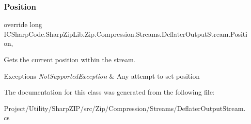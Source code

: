 \subsubsection{\texorpdfstring{Position}{Position}}
{\footnotesize\ttfamily override long I\+C\+Sharp\+Code.\+Sharp\+Zip\+Lib.\+Zip.\+Compression.\+Streams.\+Deflater\+Output\+Stream.\+Position\hspace{0.3cm}{\ttfamily [get]}, {\ttfamily [set]}}



Gets the current position within the stream. 


\begin{DoxyExceptions}{Exceptions}
{\em Not\+Supported\+Exception} & Any attempt to set position\\
\hline
\end{DoxyExceptions}


The documentation for this class was generated from the following file\+:\begin{DoxyCompactItemize}
\item 
Project/\+Utility/\+Sharp\+Z\+I\+P/src/\+Zip/\+Compression/\+Streams/Deflater\+Output\+Stream.\+cs\end{DoxyCompactItemize}

